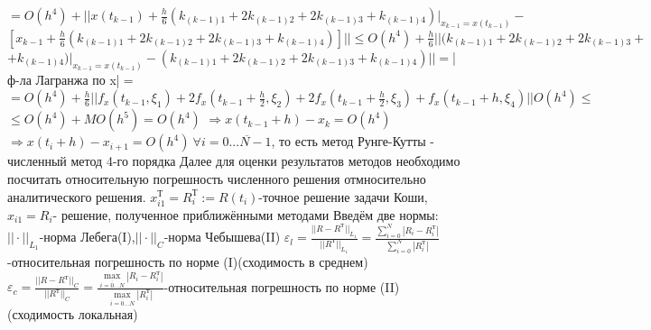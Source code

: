 \documentclass[a4paper,14pt]{article}
\begin{document}
$=O(h^4)+||x(t_{k-1})+\frac{h}{6}(k_{(k-1)1}+2k_{(k-1)2}+2k_{(k-1)3}+k_{(k-1)4})\big|_{x_{k-1}=x(t_{k-1})}-$\newline
$[x_{k-1}+\frac{h}{6}(k_{(k-1)1}+2k_{(k-1)2}+2k_{(k-1)3}+k_{(k-1)4})]||\leq O(h^4)+\frac{h}{6}||(k_{(k-1)1}+2k_{(k-1)2}+2k_{(k-1)3}+$\newline
$+k_{(k-1)4})\big|_{x_{k-1}=x(t_{k-1})}-(k_{(k-1)1}+2k_{(k-1)2}+2k_{(k-1)3}+k_{(k-1)4})||=$|ф-ла Лагранжа по x|$=$\newline
$=O(h^4)+\frac{h}{6}||f_x(t_{k-1},\xi_1)+2f_x(t_{k-1}+\frac{h}{2},\xi_2)+2f_x(t_{k-1}+\frac{h}{2},\xi_3)+f_x(t_{k-1}+h,\xi_4)||O(h^4)\leq$\newline
$\leq O(h^4)+MO(h^5)=O(h^4)$\newline
$\Rightarrow x(t_{k-1}+h)-x_{k}=O(h^4)$\newline
$\Rightarrow x(t_i+h)-x_{i+1}=O(h^4)\ \forall i=\overline{0...N-1}$, то есть метод Рунге-Кутты - численный метод 4-го порядка\newline
\indent Далее для оценки результатов методов необходимо посчитать относительную погрешность численного решения отмносительно аналитического решения.\newline
$x_{i1}^{\text{Т}}=R_i^{\text{Т}}:=R(t_i)$-точное решение задачи Коши, $x_{i1}=R_i$- решение, полученное приближёнными методами\newline
Введём две нормы: $||\cdot||_{L_1}$-норма Лебега(I),$||\cdot||_C$-норма Чебышева(II)\newline
$\varepsilon_l = \frac{||R-R^{\text{Т}}||_{L_1}}{||R^{\text{Т}}||_{L_1}} = \frac{\sum\limits_{i=0}^{N}|R_i-R_{i}^{\text{Т}}|}{\sum\limits_{i=0}^{N}|R_{i}^{\text{Т}}|}$-относительная погрешность по норме (I)(сходимость в среднем)\newline
$\varepsilon_c = \frac{||R-R^{\text{Т}}||_{C}}{||R^{\text{Т}}||_{C}} = \frac{\max\limits_{\overline{i=0...N}}|R_i-R_{i}^{\text{Т}}|}{\max\limits_{\overline{i=0...N}}|R_{i}^{\text{Т}}|}$-относительная погрешность по норме (II)(сходимость локальная)\newline
\end{document}
